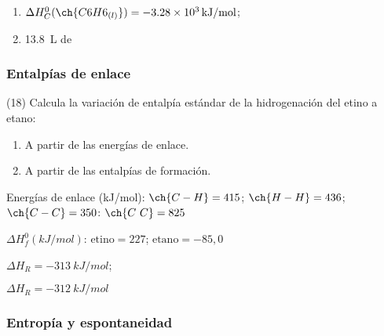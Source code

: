 \documentclass[10pt]{article}
\newenvironment{gexdatos}{
  \noindent\makebox[0pt][r]{\textit{Datos:}}
  }{\vspace{5pt}}
\begin{document}
\begin{multicols}{2}
\begin{exercise}[
    tags    = {},
    topics  = {química,química básica},
    source  = {FQ 1B MGH 2016, p85, e26},
  ]
\end{exercise}

\begin{solution}
  \begin{enumerate}
    \item \( \Delta H^0_C (\ch{C6H6_{(l)}}) = \SI{-3.28e3}{kJ/mol} \); \item \SI{13.8}{\liter} de 
  \end{enumerate}
\end{solution}




\subsubsection{Entalpías de enlace}




\begin{exercise}[
    tags    = {},
    topics  = {química,química básica},
    source  = {FQ 1B MGH 2016, p85, e26},
  ]

  (18) Calcula la variación de entalpía estándar de la hidrogenación del etino a etano:

  \begin{enumerate}
    \item A partir de las energías de enlace.
    \item A partir de las entalpías de formación.
  \end{enumerate}

  \begin{gexdatos}
    Energías de enlace (\si{kJ/mol}): \( \ch{C-H} = 415 \); \( \ch{H-H} = 436 \); \( \ch{C-C} = 350 \): \( \ch{C~C} = 825 \)

    \( \Delta H^0_f (\si{kJ/mol}) \): \( \textrm{etino} = 227 \); \( \textrm{etano} = -85,0 \)
  \end{gexdatos}


\end{exercise}

\begin{solution}
  \begin{enumerate*}
    \item \( \Delta H_R = \SI{-313}{kJ/mol} \); \item \( \Delta H_R = \SI{-312}{kJ/mol} \)
  \end{enumerate*}
\end{solution}



\subsubsection{Entropía y espontaneidad}





\end{multicols}
\end{document}

